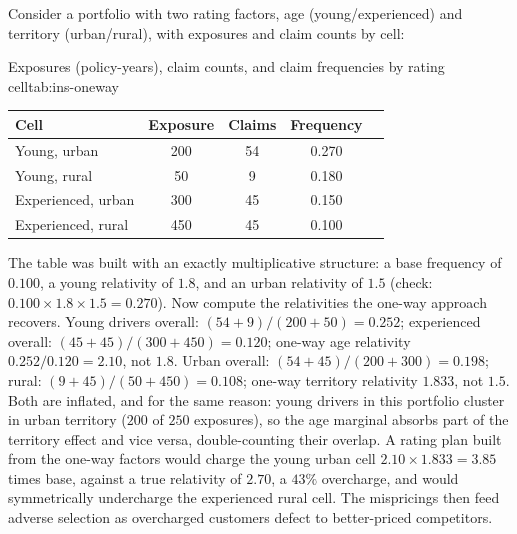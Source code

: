 \documentclass[../ai_in_finance]{subfiles}
\begin{document}
Consider a portfolio with two rating factors, age (young/experienced) and territory (urban/rural), with exposures and claim counts by cell:

\begin{booktable}[htbp]{Exposures (policy-years), claim counts, and claim frequencies by rating cell}{tab:ins-oneway}
\begin{tabular}{lcccc}
\toprule
Cell & Exposure & Claims & Frequency \\
\midrule
Young, urban & 200 & 54 & 0.270 \\
Young, rural & 50 & 9 & 0.180 \\
Experienced, urban & 300 & 45 & 0.150 \\
Experienced, rural & 450 & 45 & 0.100 \\
\bottomrule
\end{tabular}
\end{booktable}

The table was built with an exactly multiplicative structure: a base frequency of $0.100$, a young relativity of $1.8$, and an urban relativity of $1.5$ (check: $0.100 \times 1.8 \times 1.5 = 0.270$). Now compute the relativities the one-way approach recovers. Young drivers overall: $(54+9)/(200+50) = 0.252$; experienced overall: $(45+45)/(300+450) = 0.120$; one-way age relativity $0.252/0.120 = 2.10$, not $1.8$. Urban overall: $(54+45)/(200+300) = 0.198$; rural: $(9+45)/(50+450) = 0.108$; one-way territory relativity $1.833$, not $1.5$. Both are inflated, and for the same reason: young drivers in this portfolio cluster in urban territory ($200$ of $250$ exposures), so the age marginal absorbs part of the territory effect and vice versa, double-counting their overlap. A rating plan built from the one-way factors would charge the young urban cell $2.10 \times 1.833 = 3.85$ times base, against a true relativity of $2.70$, a $43\%$ overcharge, and would symmetrically undercharge the experienced rural cell. The mispricings then feed adverse selection as overcharged customers defect to better-priced competitors.
\end{document}
